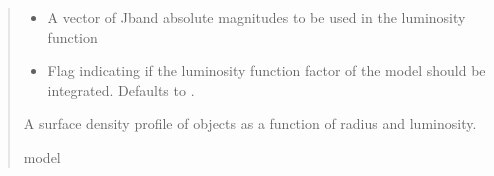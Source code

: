 \documentclass[letterpaper,12pt,english]{sphinxmanual}
\begin{document}
\begin{fulllineitems}
\begin{quote}
\begin{description}
\begin{itemize}
\item {} 
\sphinxAtStartPar
{} \textendash{} A vector of J\sphinxhyphen{}band absolute magnitudes to be used in the luminosity function

\item {} 
\sphinxAtStartPar
{} \textendash{} Flag indicating if the luminosity function factor of the model should be integrated. Defaults to .

\end{itemize}

\sphinxAtStartPar
A surface density profile of objects as a function of radius and luminosity.

\sphinxAtStartPar
model

\end{description}\end{quote}

\end{fulllineitems}



\renewcommand{\indexname}{Python Module Index}
\begin{sphinxtheindex}
\let\bigletter\sphinxstyleindexlettergroup
\bigletter{s}
\item\relax{}
\item\relax{}
\end{sphinxtheindex}

\renewcommand{\indexname}{Index}
\printindex
\end{document}
